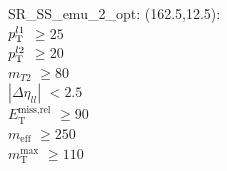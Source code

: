 SR\_SS\_emu\_2\_opt: (162.5,12.5): \\
$p_{\text{T}}^{l1}$ $\geq 25$ \\
$p_{\text{T}}^{l2}$ $\geq 20$ \\
$m_{T2}$ $\geq 80$ \\
$|\Delta\eta_{ll}|$ $<2.5$ \\
$E_{\text{T}}^{\text{miss,rel}}$ $\geq 90$ \\
$m_{\text{eff}}$ $\geq 250$ \\
$m_{\text{T}}^{\text{max}}$ $\geq 110$ \\
